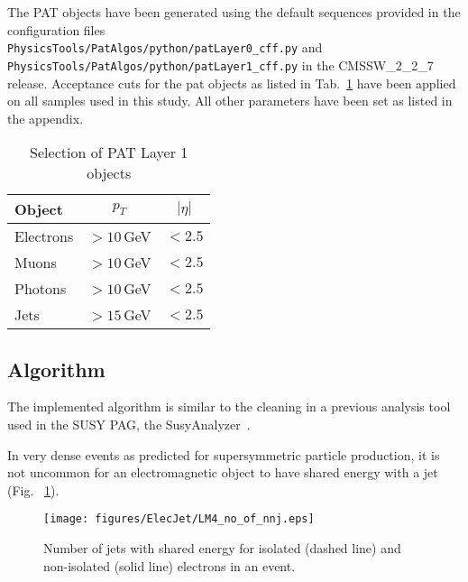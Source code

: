 \documentclass{cmspaper}
\begin{document}
The PAT objects have been generated using the default sequences provided in the
configuration files\\
\texttt{PhysicsTools/PatAlgos/python/patLayer0\_cff.py} and\\
\texttt{PhysicsTools/PatAlgos/python/patLayer1\_cff.py} in the CMSSW\_2\_2\_7
release. Acceptance cuts for the pat objects as listed in
Tab.~\ref{tab:PATobjCuts} have been applied on all samples used in this study.
All other parameters have been set as listed in the appendix.

\begin{table}[h]
\caption{Selection of PAT Layer 1 objects}
\begin{center}
\begin{tabular}{l|c|c}
\textbf{Object} & \textbf{$p_T$} & \textbf{$|\eta|$} \\ \hline
    Electrons & $>10$\,GeV & $<2.5$  \\\hline
    Muons     & $>10$\,GeV & $<2.5$  \\\hline
    Photons   & $>10$\,GeV & $<2.5$  \\\hline
    Jets      & $>15$\,GeV & $<2.5$
\end{tabular}
\end{center}
\label{tab:PATobjCuts}
\end{table}

\subsection{Algorithm}
The implemented algorithm is similar to the cleaning in a previous analysis
tool used in the SUSY PAG, the SusyAnalyzer~\cite{wikiSusyAnalyzer}.

In very dense events as predicted for supersymmetric particle production, it is
not uncommon for an electromagnetic object to have shared energy with a jet
(Fig. ~\ref{fig:NbJets}).

\begin{figure}[hbt]
  \begin{center}
    \texttt{[image: figures/ElecJet/LM4\_no\_of\_nnj.eps]}
    \caption{Number of jets with shared energy for isolated (dashed line) and
    non-isolated (solid line) electrons in an event.}
    \label{fig:NbJets}
  \end{center}
\end{figure}
\end{document}
